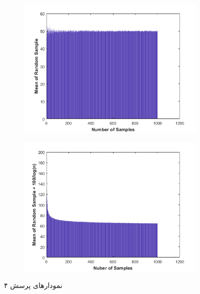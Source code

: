 \documentclass[10pt]{article}
\theoremstyle{definition}
\theoremstyle{lemma}
\theoremstyle{theorem}
\theoremstyle{remark}
\begin{document}
	\begin{figure}[h!]
		\centering
		\begin{subfigure}[h!]{0.8\textwidth}
			\includegraphics[width=\textwidth]{./Images/4/1.png}
			\caption{  }
		\end{subfigure}
		\quad
		\begin{subfigure}[h!]{0.8\textwidth}
			\includegraphics[width=\textwidth]{./Images/4/2.png}
			\caption{  }
		\end{subfigure}
		
		\caption{نمودار‌های پرسش ۴}
		\label{q4}
	\end{figure}
	
\end{document}
